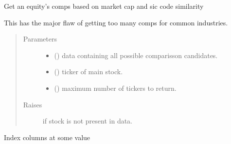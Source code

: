 \documentclass[letterpaper,10pt,english]{sphinxmanual}
\begin{document}
\begin{fulllineitems}
\label{\detokenize{dalio.ops:dalio.ops.get_comps_by_sic}}
Get an equity’s comps based on market cap and sic code similarity

This has the major flaw of getting too many comps for common industries.
\begin{quote}\begin{description}
\item[{Parameters}] \leavevmode\begin{itemize}
\item {} 
 () \textendash{} data containing all possible comparisson
candidates.

\item {} 
 () \textendash{} ticker of main stock.

\item {} 
 () \textendash{} maximum number of tickers to return.

\end{itemize}

\item[{Raises}] \leavevmode
{} \textendash{} if stock is not present in data.

\end{description}\end{quote}

\end{fulllineitems}


\begin{fulllineitems}
\label{\detokenize{dalio.ops:dalio.ops.index_cols}}
Index columns at some value

\end{fulllineitems}

\end{document}
